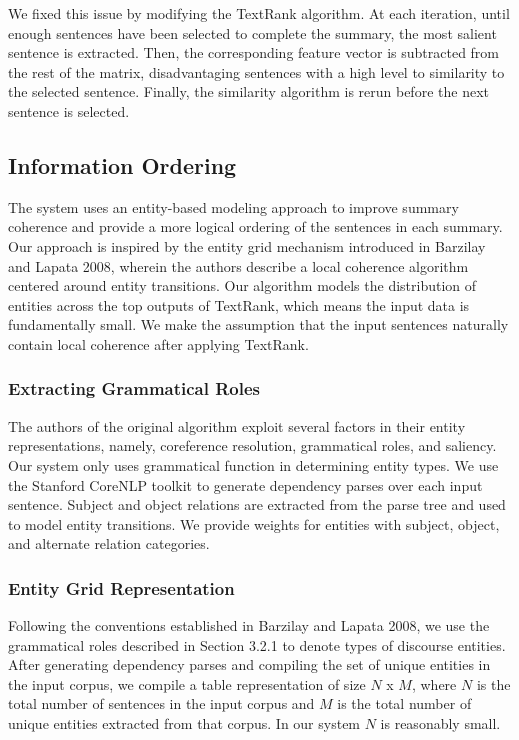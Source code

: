 \documentclass[11pt]{article}
\begin{document}
We fixed this issue by modifying the TextRank algorithm. At each iteration, until enough sentences have been selected to complete the summary, the most salient sentence is extracted. Then, the corresponding feature vector is subtracted from the rest of the matrix, disadvantaging sentences with a high level to similarity to the selected sentence. Finally, the similarity algorithm is rerun before the next sentence is selected.\\

\subsection{Information Ordering}
The system uses an entity-based modeling approach to improve summary coherence and provide a more logical ordering of the sentences in each summary. Our approach is inspired by the entity grid mechanism introduced in Barzilay and Lapata 2008, wherein the authors describe a local coherence algorithm centered around entity transitions. Our algorithm models the distribution of entities across the top outputs of TextRank, which means the input data is fundamentally small. We make the assumption that the input sentences naturally contain local coherence after applying TextRank. 

\subsubsection{Extracting Grammatical Roles}
The authors of the original algorithm exploit several factors in their entity representations, namely, coreference resolution, grammatical roles, and saliency. Our system only uses grammatical function in determining entity types. We use the Stanford CoreNLP toolkit to generate dependency parses over each input sentence. Subject and object relations are extracted from the parse tree and used to model entity transitions. We provide weights for entities with subject, object, and alternate relation categories.

\subsubsection{Entity Grid Representation}
Following the conventions established in Barzilay and Lapata 2008, we use the grammatical roles described in Section 3.2.1 to denote types of discourse entities. After generating dependency parses and compiling the set of unique entities in the input corpus, we compile a table representation of size $N$ x $M$, where $N$ is the total number of sentences in the input corpus and $M$ is the total number of unique entities extracted from that corpus. In our system $N$ is reasonably small.
\end{document}
